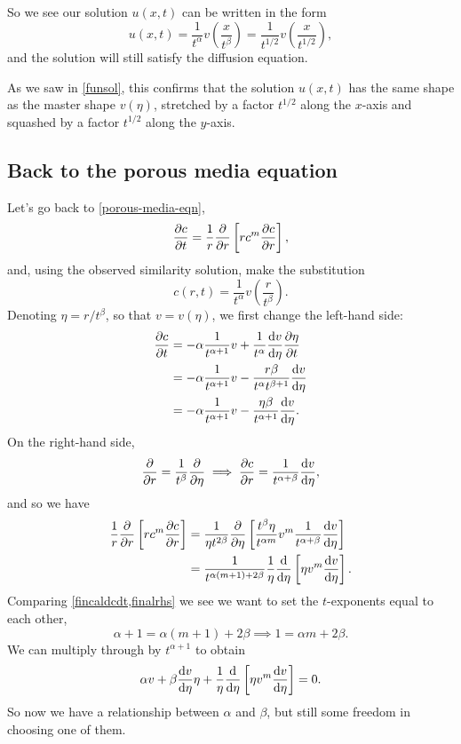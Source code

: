 \documentclass[main.tex]{subfiles}
\begin{document}
So we see our solution $u(x,t)$ can be written in the form
\begin{equation}
u(x,t) = \frac{1}{t^\alpha}v\left(\frac{x}{t^{\beta}}\right) =  \frac{1}{t^{1/2}}v\left(\frac{x}{t^{1/2}}\right),
\end{equation}
and the solution will still satisfy the diffusion equation. 

As we saw in \cref{funsol}, this confirms that the solution $u(x,t)$ has the same shape as the master shape $v(\eta)$, stretched by a factor $t^{1/2}$ along the $x$-axis and squashed by a factor $t^{1/2}$ along the $y$-axis. 

\subsection{Back to the porous media equation}

Let's go back to \cref{porous-media-eqn},
\begin{equation}
\label{radialpde}
\pd{c}{t} = \frac{1}{r}\pd{}{r}\left[r c^m \pd{c}{r}\right],
\end{equation}
and, using the observed similarity solution, make the substitution
\begin{equation}
	c(r,t) = \frac{1}{t^{\alpha}}v\left(\frac{r}{t^{\beta}}\right).
\end{equation}
Denoting $\eta=r/t^{\beta}$, so that $v=v(\eta)$, we first change the left-hand side:
\begin{align}
\pd{c}{t} &= -\alpha\frac{1}{t^{\alpha+1}}v + \frac{1}{t^{\alpha}}\fd{v}{\eta}\pd{\eta}{t} \\
 &=  -\alpha\frac{1}{t^{\alpha+1}}v  - \frac{r \beta}{t^{\alpha}t^{\beta+1}}\fd{v}{\eta}\\
\label{fincaldcdt}& =   -\alpha\frac{1}{t^{\alpha+1}}v  - \frac{\eta \beta}{t^{\alpha+1}}\fd{v}{\eta}.
\end{align}
On the right-hand side,
\begin{equation}
\pd{}{r} = \frac{1}{t^\beta}\pd{}{\eta} \implies \pd{c}{r}= \frac{1}{t^{\alpha+\beta}}\fd{v}{\eta},
\end{equation}
and so we have 
\begin{align}
 \frac{1}{r}\pd{}{r}\left[r c^m \pd{c}{r}\right]&=\frac{1}{\eta t^{2\beta}}\pd{}{\eta}\left[\frac{t^\beta \eta}{t^{\alpha m}}v^m  \frac{1}{t^{\alpha+\beta}}\fd{v}{\eta}\right]\\
\label{finalrhs}&= \frac{1}{t^{\alpha(m+1)+2\beta}}\frac{1}{\eta}\fd{}{\eta}\left[\eta v^m \fd{v}{\eta}\right].
\end{align}
Comparing \cref{fincaldcdt,finalrhs} we see we want to set the $t$-exponents equal to each other, 
\begin{equation}
\alpha + 1 = \alpha(m+1) + 2\beta  \implies 1 = \alpha m + 2\beta.
\end{equation}
We can multiply through by $t^{\alpha+1}$ to obtain
\begin{equation}
\alpha v + \beta \fd{v}{\eta}\eta +\frac{1}{\eta}\fd{}{\eta}\left[\eta v^m\fd{v}{\eta}\right] =0.
\label{rel-between-alpha-and-beta}
\end{equation}
So now we have a relationship between $\alpha$ and $\beta$, but still some freedom in choosing one of them. 
\end{document}
